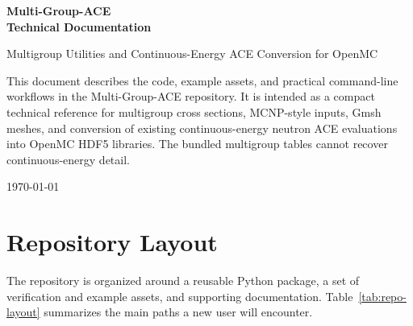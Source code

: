 \documentclass[11pt]{article}
\begin{document}
\begin{titlepage}
\centering
\vspace*{2cm}
{\Huge\bfseries Multi-Group-ACE\\[0.4cm]Technical Documentation\par}
\vspace{1.25cm}
{\Large Multigroup Utilities and Continuous-Energy ACE Conversion for OpenMC\par}
\vfill
\begin{minipage}{0.85\textwidth}
\centering
This document describes the code, example assets, and practical command-line workflows in the Multi-Group-ACE repository. It is intended as a compact technical reference for multigroup cross sections, MCNP-style inputs, Gmsh meshes, and conversion of existing continuous-energy neutron ACE evaluations into OpenMC HDF5 libraries. The bundled multigroup tables cannot recover continuous-energy detail.
\end{minipage}
\vfill
{\large \today\par}
\end{titlepage}

\tableofcontents
\newpage

\section{Repository Layout}

The repository is organized around a reusable Python package, a set of verification and example assets, and supporting documentation. Table~\ref{tab:repo-layout} summarizes the main paths a new user will encounter.
\end{document}
